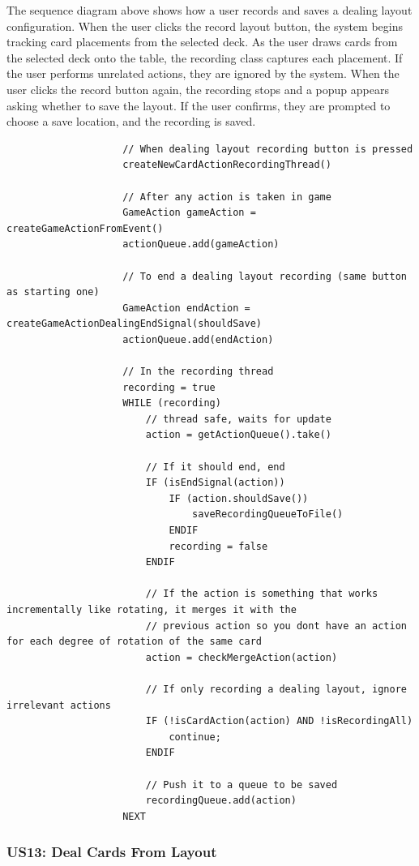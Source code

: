 \documentclass[a4paper]{project}
\begin{document}
				The sequence diagram above shows how a user records and saves a dealing layout configuration. When the user clicks the record layout button, the system begins tracking card placements from the selected deck. As the user draws cards from the selected deck onto the table, the recording class captures each placement. If the user performs unrelated actions, they are ignored by the system. When the user clicks the record button again, the recording stops and a popup appears asking whether to save the layout. If the user confirms, they are prompted to choose a save location, and the recording is saved.
				
				\vfill
				
				\begin{lstlisting}
					// When dealing layout recording button is pressed
					createNewCardActionRecordingThread()
					
					// After any action is taken in game
					GameAction gameAction = createGameActionFromEvent()
					actionQueue.add(gameAction)
					
					// To end a dealing layout recording (same button as starting one)
					GameAction endAction = createGameActionDealingEndSignal(shouldSave)
					actionQueue.add(endAction)
					
					// In the recording thread
					recording = true
					WHILE (recording)
						// thread safe, waits for update
						action = getActionQueue().take()
					
						// If it should end, end
						IF (isEndSignal(action))
							IF (action.shouldSave())
								saveRecordingQueueToFile()
							ENDIF
							recording = false
						ENDIF
						
						// If the action is something that works incrementally like rotating, it merges it with the
						// previous action so you dont have an action for each degree of rotation of the same card
						action = checkMergeAction(action)
						
						// If only recording a dealing layout, ignore irrelevant actions
						IF (!isCardAction(action) AND !isRecordingAll)
							continue;
						ENDIF
						
						// Push it to a queue to be saved
						recordingQueue.add(action)
					NEXT
				\end{lstlisting}
				
				\clearpage
			
			\subsubsection*{US13: Deal Cards From Layout}\label{subsubsec:us13-deal-cards-from-a-layout}
			
\end{document}
